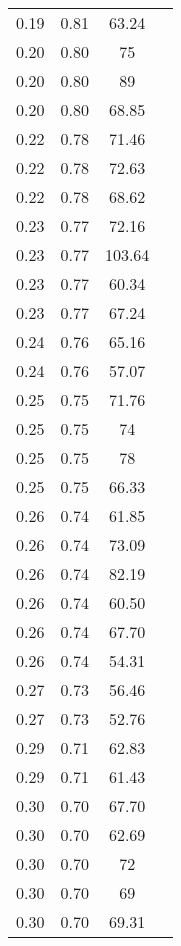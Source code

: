 \begin{longtable}[H]{ c c c c }
	 0.19 & 0.81 & 63.24 & \cite{Timoshevskii2011}\\
	 0.20 & 0.80 & 75 & \cite{Friak2012}\\
	 0.20 & 0.80 & 89 & \cite{Friak2012}\\
	 0.20 & 0.80 & 68.85 & \cite{Karre2015}\\
	 0.22 & 0.78 & 71.46 & \cite{Ozaki2004}\\
	 0.22 & 0.78 & 72.63 & \cite{Karre2015}\\
	 0.22 & 0.78 & 68.62 & \cite{Karre2015}\\
	 0.23 & 0.77 & 72.16 & \cite{Timoshevskii2011}\\
	 0.23 & 0.77 & 103.64 & \cite{Ozaki2004}\\
	 0.23 & 0.77 & 60.34 & \cite{Karre2015}\\
	 0.23 & 0.77 & 67.24 & \cite{Karre2015}\\
	 0.24 & 0.76 & 65.16 & \cite{Karre2015}\\
	 0.24 & 0.76 & 57.07 & \cite{Karre2015}\\
	 0.25 & 0.75 & 71.76 & \cite{Timoshevskii2011}\\
	 0.25 & 0.75 & 74 & \cite{Friak2012}\\
	 0.25 & 0.75 & 78 & \cite{Friak2012}\\
	 0.25 & 0.75 & 66.33 & \cite{Ozaki2004}\\
	 0.26 & 0.74 & 61.85 & \cite{Karre2015}\\
	 0.26 & 0.74 & 73.09 & \cite{Karre2015}\\
	 0.26 & 0.74 & 82.19 & \cite{Ozaki2004}\\
	 0.26 & 0.74 & 60.50 & \cite{Ozaki2004}\\
	 0.26 & 0.74 & 67.70 & \cite{Timoshevskii2011}\\
	 0.26 & 0.74 & 54.31 & \cite{Karre2015}\\
	 0.27 & 0.73 & 56.46 & \cite{Karre2015}\\
	 0.27 & 0.73 & 52.76 & \cite{Karre2015}\\
	 0.29 & 0.71 & 62.83 & \cite{Ozaki2004}\\
	 0.29 & 0.71 & 61.43 & \cite{Ozaki2004}\\
	 0.30 & 0.70 & 67.70 & \cite{Timoshevskii2011}\\
	 0.30 & 0.70 & 62.69 & \cite{Karre2015}\\
	 0.30 & 0.70 & 72 & \cite{Friak2012}\\
	 0.30 & 0.70 & 69 & \cite{Friak2012}\\
	 0.30 & 0.70 & 69.31 & \cite{Karre2015}\\

\end{longtable}
